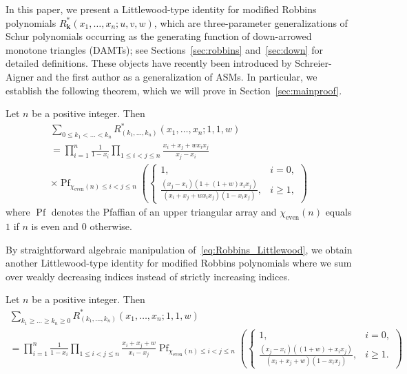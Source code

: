 \documentclass[ALCO, Unicode]{cedram}
\DeclareMathOperator*{\pf}{Pf}
\newcommand{\boldk}{\boldsymbol{k}}
\begin{document}
	In this paper, we present a Littlewood-type identity for modified Robbins polynomials $R^{\ast}_{\boldk}(x_{1},\ldots,x_{n};u,v,w)$, which are three-parameter generalizations of Schur polynomials occurring as the generating function of down-arrowed monotone triangles (DAMTs); see 
	Sections~\ref{sec:robbins} and~\ref{sec:down} for detailed definitions. These objects have recently been introduced by Schreier-Aigner and the first author as a generalization of ASMs. In particular, we establish the following theorem, which we will prove in Section~\ref{sec:mainproof}.
	\begin{thm}
		\label{thm:Robbins_Littlewood}
		Let $n$ be a positive integer. Then 
		\begin{multline}\label{eq:Robbins_Littlewood}
			\sum_{0 \le k_1 < \dots < k_n} R^{\ast}_{(k_{1},\ldots,k_{n})}(x_{1},\ldots,x_{n};1,1,w)\\
			=\prod_{i=1}^n \frac{1}{1-x_i}  \prod_{1 \le i < j \le n} \frac{x_i+x_j+w x_i x_j}{x_j-x_i}\\
			\times
			\pf_{\chi_{\mathrm{even}}(n) \le i < j \le n} \left(
			\begin{cases}
				1, & i=0,\\
				\frac{(x_j-x_i)(1+(1+w) x_i x_j)}{(x_i+x_j+w x_i x_j)(1-x_i x_j)},& i\ge 1,
			\end{cases} \right)
		\end{multline}
		where $\pf$ denotes the Pfaffian of an upper triangular array and $\chi_{\mathrm{even}}(n)$ equals $1$ if $n$ is even and $0$ otherwise.
	\end{thm}
	
	By straightforward algebraic manipulation of~\eqref{eq:Robbins_Littlewood}, we obtain another Littlewood-type identity for modified Robbins polynomials where we sum over weakly decreasing indices instead of strictly increasing indices.
	
	\begin{cor}\label{cor:Littlewood}
		Let $n$ be a positive integer. Then 
		\begin{multline*}
			\sum_{k_1 \ge \dots \ge k_n \ge 0} R^{\ast}_{(k_{1},\ldots,k_{n})}(x_{1},\dots,x_{n};1,1,w)\\
			=  \prod_{i=1}^n \frac{1}{1-x_i}  \prod_{1 \le i < j \le n} \frac{x_i+x_j+w}{x_i-x_j}
			\pf_{\chi_{\mathrm{even}}(n) \le i < j \le n} \left(
			\begin{cases}
				1, & i=0,\\
				\frac{(x_j-x_i)((1+w) + x_i x_j)}{(x_i+x_j+w)(1-x_i x_j)},& i\ge 1.
			\end{cases} \right)
		\end{multline*}
	\end{cor}
	
\end{document}

